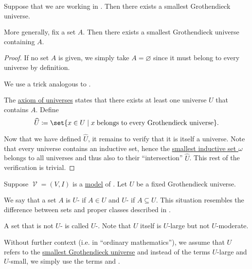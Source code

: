 \begin{proposition}\label{thm:smallest_grothendieck_universe_existence}
  Suppose that we are working in . Then there exists a smallest Grothendieck universe.

  More generally, fix a set \( A \). Then there exists a smallest Grothendieck universe containing \( A \).
\end{proposition}
\begin{proof}
  If no set \( A \) is given, we simply take \( A = \varnothing \) since it must belong to every universe by definition.

  We use a trick analogous to .

  The \hyperref[def:axiom_of_universes]{axiom of universes} states that there exists at least one universe \( U \) that contains \( A \). Define
  \begin{equation*}
    \widehat U \coloneqq \set{ x \in U \given x \T{belongs to every Grothendieck universe} }.
  \end{equation*}

  Now that we have defined \( \widehat U \), it remains to verify that it is itself a universe. Note that every universe contains an inductive set, hence the \hyperref[thm:smallest_inductive_set_existence]{smallest inductive set \( \omega \)} belongs to all universes and thus also to their \enquote{intersection} \( \widehat U \). This rest of the verification is trivial.
\end{proof}

\begin{definition}\label{def:large_and_small_sets}
  Suppose \( \mscrV = (V, I) \) is a \hyperref[def:first_order_semantics/satisfiability]{model} of . Let \( U \) be a fixed Grothendieck universe.

  We say that a set \( A \) is \( U \)- if \( A \in U \) and \( U \)- if \( A \subseteq U \). This situation resembles the difference between sets and proper classes described in .

  A set that is not \( U \)- is called \( U \)-. Note that \( U \) itself is \( U \)-large but not \( U \)-moderate.

  Without further context (i.e. in \enquote{ordinary mathematics}), we assume that \( U \) refers to the \hyperref[thm:smallest_grothendieck_universe_existence]{smallest Grothendieck universe} and instead of the terms \( U \)-large and \( U \)-small, we simply use the terms  and .
\end{definition}
